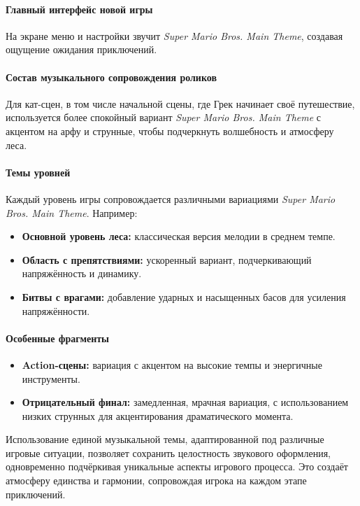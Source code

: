 \documentclass{article}
\begin{document}
\paragraph{Главный интерфейс новой игры}  
На экране меню и настройки звучит \textit{Super Mario Bros. Main Theme}, создавая ощущение ожидания приключений.

\paragraph{Состав музыкального сопровождения роликов}  
Для кат-сцен, в том числе начальной сцены, где Грек начинает своё путешествие, используется более спокойный вариант \textit{Super Mario Bros. Main Theme} с акцентом на арфу и струнные, чтобы подчеркнуть волшебность и атмосферу леса.

\paragraph{Темы уровней}  
Каждый уровень игры сопровождается различными вариациями \textit{Super Mario Bros. Main Theme}. Например:  
\begin{itemize}
    \item \textbf{Основной уровень леса:} классическая версия мелодии в среднем темпе.  
    \item \textbf{Область с препятствиями:} ускоренный вариант, подчеркивающий напряжённость и динамику.  
    \item \textbf{Битвы с врагами:} добавление ударных и насыщенных басов для усиления напряжённости.  
\end{itemize}

\paragraph{Особенные фрагменты}  
\begin{itemize}
    \item \textbf{Action-сцены:} вариация с акцентом на высокие темпы и энергичные инструменты.  
    \item \textbf{Отрицательный финал:} замедленная, мрачная вариация, с использованием низких струнных для акцентирования драматического момента.  
\end{itemize}

Использование единой музыкальной темы, адаптированной под различные игровые ситуации, позволяет сохранить целостность звукового оформления, одновременно подчёркивая уникальные аспекты игрового процесса. Это создаёт атмосферу единства и гармонии, сопровождая игрока на каждом этапе приключений.
\end{document}
